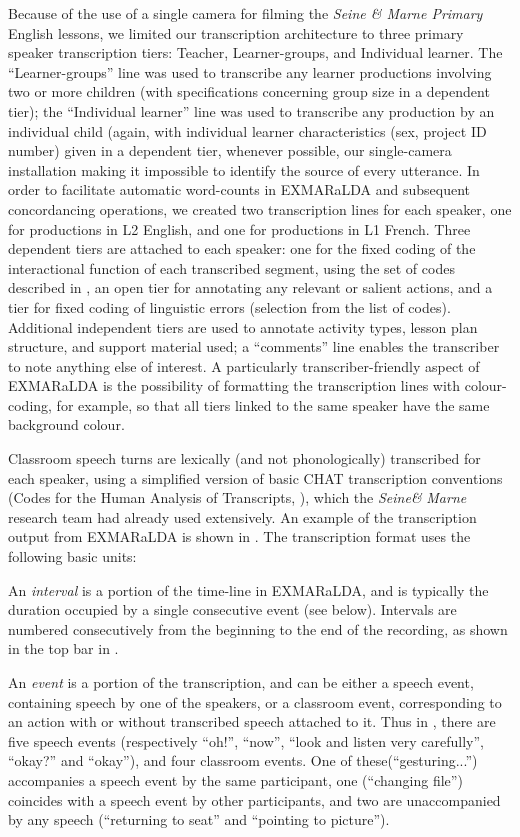 \documentclass[output=paper,colorlinks,citecolor=brown,modfonts,nonflat]{../langscibook}
\begin{document}
Because of the use of a single camera for filming the \textit{Seine \& Marne Primary} English lessons, we limited our transcription architecture to three primary speaker transcription tiers: Teacher, Learner-groups, and Individual learner. The “Learner-groups” line was used to transcribe any learner productions involving two or more children (with specifications concerning group size in a dependent tier); the “Individual learner” line was used to transcribe any production by an individual child (again, with individual learner characteristics (sex, project ID number) given in a dependent tier, whenever possible, our single-camera installation making it impossible to identify the source of every utterance. In order to facilitate automatic word-counts in EXMARaLDA and subsequent concordancing operations, we created two transcription lines for each speaker, one for productions in L2 English, and one for productions in L1 French. Three dependent tiers are attached to each speaker: one for the fixed coding of the interactional function of each transcribed segment, using the set of codes described in , an open tier for annotating any relevant or salient actions, and a tier for fixed coding of linguistic errors (selection from the list of codes). Additional independent tiers are used to annotate activity types, lesson plan structure, and support material used; a “comments” line enables the transcriber to note anything else of interest. A particularly transcriber-friendly aspect of EXMARaLDA is the possibility of formatting the transcription lines with colour-coding, for example, so that all tiers linked to the same speaker have the same background colour.

Classroom speech turns are lexically (and not phonologically) transcribed for each speaker, using a simplified version of basic CHAT transcription conventions (Codes for the Human Analysis of Transcripts, \citealt{MacWhinney2000}), which the \textit{Seine\&} \textit{Marne} research team had already used extensively. An example of the transcription output from EXMARaLDA is shown in . The transcription format uses the following basic units:

An \textit{interval} is a portion of the time-line in EXMARaLDA, and is typically the duration occupied by a single consecutive event (see below). Intervals are numbered consecutively from the beginning to the end of the recording, as shown in the top bar in .

An \textit{event} is a portion of the transcription, and can be either a speech event, containing speech by one of the speakers, or a classroom event, corresponding to an action with or without transcribed speech attached to it. Thus in , there are five speech events (respectively “oh!”, “now”, “look and listen very carefully”, “okay?” and “okay”), and four classroom events. One of these(“gesturing...”) accompanies a speech event by the same participant, one (“changing file”) coincides with a speech event by other participants, and two are unaccompanied by any speech (“returning to seat” and “pointing to picture”).
\end{document}

